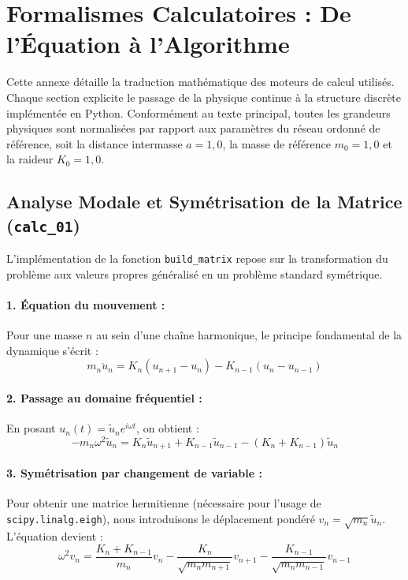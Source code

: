 \section{Formalismes Calculatoires : De l'Équation à l'Algorithme}\label{annexe:computational_logic}

Cette annexe détaille la traduction mathématique des moteurs de calcul utilisés. Chaque section explicite le passage de la physique continue à la structure discrète implémentée en Python. Conformément au texte principal, toutes les grandeurs physiques sont normalisées par rapport aux paramètres du réseau ordonné de référence, soit la distance intermasse $a = 1{,}0$, la masse de référence $m_0 = 1{,}0$ et la raideur $K_0 = 1{,}0$.

\subsection{Analyse Modale et Symétrisation de la Matrice (\texttt{calc\_01})}

L'implémentation de la fonction \texttt{build\_matrix} repose sur la transformation du problème aux valeurs propres généralisé en un problème standard symétrique.

\paragraph{1. Équation du mouvement :}
Pour une masse $n$ au sein d'une chaîne harmonique, le principe fondamental de la dynamique s'écrit :
\begin{equation*}
    m_n \ddot{u}_n = K_n(u_{n+1} - u_n) - K_{n-1}(u_n - u_{n-1})
\end{equation*}

\paragraph{2. Passage au domaine fréquentiel :}
En posant $u_n(t) = \tilde{u}_n e^{i\omega t}$, on obtient :
\begin{equation*}
    -m_n \omega^2 \tilde{u}_n = K_n \tilde{u}_{n+1} + K_{n-1} \tilde{u}_{n-1} - (K_n + K_{n-1}) \tilde{u}_n
\end{equation*}

\paragraph{3. Symétrisation par changement de variable :}
Pour obtenir une matrice hermitienne (nécessaire pour l'usage de \texttt{scipy.linalg.eigh}), nous introduisons le déplacement pondéré $v_n = \sqrt{m_n} \tilde{u}_n$. L'équation devient :
\begin{equation*}
    \omega^2 v_n = \frac{K_n + K_{n-1}}{m_n} v_n - \frac{K_n}{\sqrt{m_n m_{n+1}}} v_{n+1} - \frac{K_{n-1}}{\sqrt{m_n m_{n-1}}} v_{n-1}
\end{equation*}

